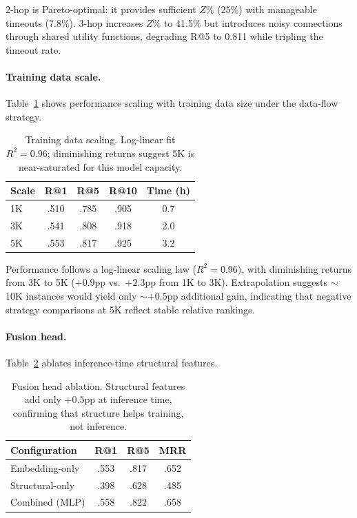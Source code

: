 \documentclass[11pt,a4paper]{article}
\begin{document}
2-hop is Pareto-optimal: it provides sufficient $Z\%$ (25\%) with manageable timeouts (7.8\%).
3-hop increases $Z\%$ to 41.5\% but introduces noisy connections through shared utility functions, degrading R@5 to 0.811 while tripling the timeout rate.

\paragraph{Training data scale.}
Table~\ref{tab:scaling} shows performance scaling with training data size under the data-flow strategy.

\begin{table}[t]
\centering
\small
\begin{tabular}{lcccc}
\toprule
\textbf{Scale} & \textbf{R@1} & \textbf{R@5} & \textbf{R@10} & \textbf{Time (h)} \\
\midrule
1K & .510 & .785 & .905 & 0.7 \\
3K & .541 & .808 & .918 & 2.0 \\
5K & .553 & .817 & .925 & 3.2 \\
\bottomrule
\end{tabular}
\caption{Training data scaling. Log-linear fit $R^2{=}0.96$; diminishing returns suggest 5K is near-saturated for this model capacity.}
\label{tab:scaling}
\end{table}

Performance follows a log-linear scaling law ($R^2{=}0.96$), with diminishing returns from 3K to 5K ($+0.9$pp vs.\ $+2.3$pp from 1K to 3K).
Extrapolation suggests $\sim$10K instances would yield only $\sim$$+0.5$pp additional gain, indicating that negative strategy comparisons at 5K reflect stable relative rankings.

\paragraph{Fusion head.}
Table~\ref{tab:fusion} ablates inference-time structural features.

\begin{table}[t]
\centering
\small
\begin{tabular}{lccc}
\toprule
\textbf{Configuration} & \textbf{R@1} & \textbf{R@5} & \textbf{MRR} \\
\midrule
Embedding-only & .553 & .817 & .652 \\
Structural-only & .398 & .628 & .485 \\
Combined (MLP) & .558 & .822 & .658 \\
\bottomrule
\end{tabular}
\caption{Fusion head ablation. Structural features add only $+0.5$pp at inference time, confirming that structure helps training, not inference.}
\label{tab:fusion}
\end{table}
\end{document}

